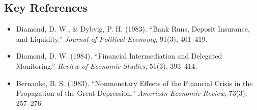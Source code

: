 \subsection*{Key References}
\begin{itemize}
    \item Diamond, D. W., \& Dybvig, P. H. (1983). ``Bank Runs, Deposit Insurance, and Liquidity.'' \textit{Journal of Political Economy}, 91(3), 401--419.
    \item Diamond, D. W. (1984). ``Financial Intermediation and Delegated Monitoring.'' \textit{Review of Economic Studies}, 51(3), 393--414.
    \item Bernanke, B. S. (1983). ``Nonmonetary Effects of the Financial Crisis in the Propagation of the Great Depression.'' \textit{American Economic Review}, 73(3), 257--276.
\end{itemize}
